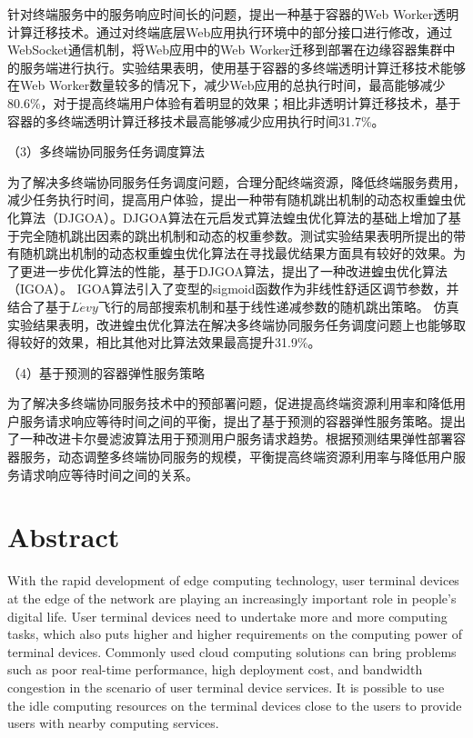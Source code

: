 针对终端服务中的服务响应时间长的问题，提出一种基于容器的Web Worker透明计算迁移技术。通过对终端底层Web应用执行环境中的部分接口进行修改，通过WebSocket通信机制，将Web应用中的Web Worker迁移到部署在边缘容器集群中的服务端进行执行。实验结果表明，使用基于容器的多终端透明计算迁移技术能够在Web Worker数量较多的情况下，减少Web应用的总执行时间，最高能够减少80.6\%，对于提高终端用户体验有着明显的效果；相比非透明计算迁移技术，基于容器的多终端透明计算迁移技术最高能够减少应用执行时间31.7\%。

（3）多终端协同服务任务调度算法 

为了解决多终端协同服务任务调度问题，合理分配终端资源，降低终端服务费用，减少任务执行时间，提高用户体验，提出一种带有随机跳出机制的动态权重蝗虫优化算法（DJGOA）。DJGOA算法在元启发式算法蝗虫优化算法的基础上增加了基于完全随机跳出因素的跳出机制和动态的权重参数。测试实验结果表明所提出的带有随机跳出机制的动态权重蝗虫优化算法在寻找最优结果方面具有较好的效果。为了更进一步优化算法的性能，基于DJGOA算法，提出了一种改进蝗虫优化算法（IGOA）。
IGOA算法引入了变型的sigmoid函数作为非线性舒适区调节参数，并结合了基于$L\acute{e}vy$飞行的局部搜索机制和基于线性递减参数的随机跳出策略。
仿真实验结果表明，改进蝗虫优化算法在解决多终端协同服务任务调度问题上也能够取得较好的效果，相比其他对比算法效果最高提升31.9\%。

（4）基于预测的容器弹性服务策略

为了解决多终端协同服务技术中的预部署问题，促进提高终端资源利用率和降低用户服务请求响应等待时间之间的平衡，提出了基于预测的容器弹性服务策略。提出了一种改进卡尔曼滤波算法用于预测用户服务请求趋势。根据预测结果弹性部署容器服务，动态调整多终端协同服务的规模，平衡提高终端资源利用率与降低用户服务请求响应等待时间之间的关系。

\chapter*{Abstract}%

With the rapid development of edge computing technology, user terminal devices at the edge of the network are playing an increasingly important role in people's digital life.
User terminal devices need to undertake more and more computing tasks, which also puts higher and higher requirements on the computing power of terminal devices.
Commonly used cloud computing solutions can bring problems such as poor real-time performance, high deployment cost, and bandwidth congestion in the scenario of user terminal device services. It is possible to use the idle computing resources on the terminal devices close to the users to provide users with nearby computing services. 

